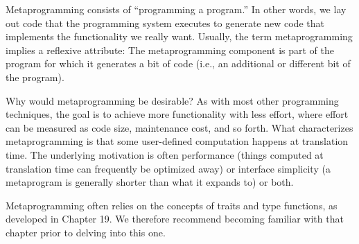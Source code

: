 Metaprogramming consists of “programming a program.” In other words, we lay out code that the programming system executes to generate new code that implements the functionality we really want. Usually, the term metaprogramming implies a reflexive attribute: The metaprogramming component is part of the program for which it generates a bit of code (i.e., an additional or different bit of the program).

Why would metaprogramming be desirable? As with most other programming techniques, the goal is to achieve more functionality with less effort, where effort can be measured as code size, maintenance cost, and so forth. What characterizes metaprogramming is that some user-defined computation happens at translation time. The underlying motivation is often performance (things computed at translation time can frequently be optimized away) or interface simplicity (a metaprogram is generally shorter than what it expands to) or both.

Metaprogramming often relies on the concepts of traits and type functions, as developed in Chapter 19. We therefore recommend becoming familiar with that chapter prior to delving into this one.